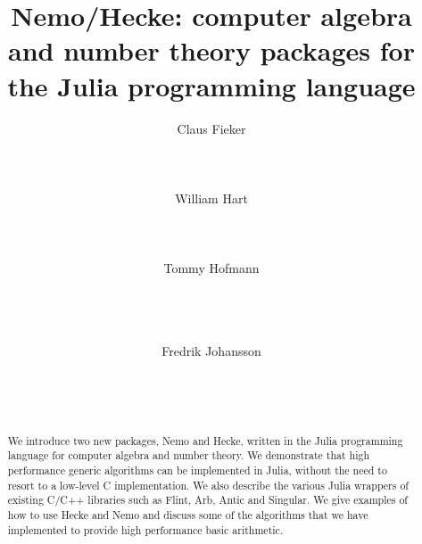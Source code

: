 \documentclass{sig-alternate-05-2015}
\begin{document}

\newtheorem{alg}{Algorithm}
\newtheorem{definition}{Definition}
\newtheorem{Assertion}{Assertion}

\makeatletter
\def\Ddots{\mathinner{\mkern1mu\raise\p@
\vbox{\kern7\p@\hbox{.}}\mkern2mu
\raise4\p@\hbox{.}\mkern2mu\raise7\p@\hbox{.}\mkern1mu}}
\makeatother

\title{Nemo/Hecke: computer algebra and number theory packages for the Julia programming language}

\author{
\alignauthor Claus Fieker\\
   \\
   \\
   \\
\alignauthor William Hart\\
   \\
   \\
   \\
\alignauthor Tommy Hofmann\\
   \\
   \\
   \\
\and
\alignauthor Fredrik Johansson\\
   \\
    \\
   \\
}

\maketitle

\begin{abstract}
We introduce two new packages, Nemo and Hecke, written in the Julia programming language
for computer algebra and number theory.
We demonstrate that high performance generic
algorithms can be implemented in Julia, without the need to resort to a low-level C
implementation. We also describe the various Julia wrappers of existing C/C++ libraries
such as Flint, Arb, Antic and Singular. We give examples of how to use Hecke and Nemo and discuss
some of the algorithms that we have implemented to provide high performance basic
arithmetic.
\end{abstract}
\end{document}
